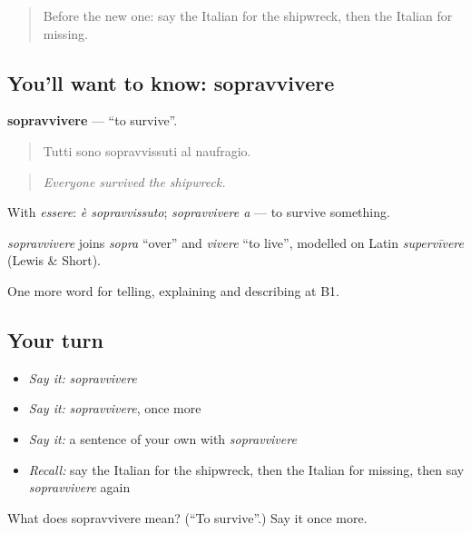 \label{lesson:IT-C306-sopravvivere}



\begin{quote}
Before the new one: say the Italian for the shipwreck, then the Italian for missing.
\end{quote}

\subsection*{You'll want to know: sopravvivere}
\textbf{sopravvivere} — \textquotedblleft{}to survive\textquotedblright{}.

\begin{quote}
Tutti sono sopravvissuti al naufragio.
\end{quote}

\begin{quote}
\emph{Everyone survived the shipwreck.}
\end{quote}

With \emph{essere}: \emph{è sopravvissuto}; \emph{sopravvivere a} — to survive something.

\begin{cousinweb}
\emph{sopravvivere} joins \emph{sopra} \textquotedblleft{}over\textquotedblright{} and \emph{vivere} \textquotedblleft{}to live\textquotedblright{}, modelled on Latin \emph{supervīvere} (Lewis \& Short).
\end{cousinweb}

\begin{grammarlens}[title={What you've built}]
One more word for telling, explaining and describing at B1.
\end{grammarlens}

\subsection*{Your turn}
\begin{itemize}
\raggedright
  \item \emph{Say it:} \emph{sopravvivere}
  \item \emph{Say it:} \emph{sopravvivere}, once more
  \item \emph{Say it:} a sentence of your own with \emph{sopravvivere}
  \item \emph{Recall:} say the Italian for the shipwreck, then the Italian for missing, then say \emph{sopravvivere} again
\end{itemize}

\begin{tcolorbox}[breakable,colback=teal!4,colframe=teal!35!black,title={Before you move on}]
What does sopravvivere mean? (\textquotedblleft{}To survive\textquotedblright{}.) Say it once more.
\end{tcolorbox}
